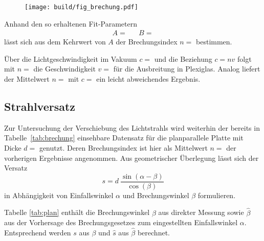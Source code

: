 \begin{figure}[H]
	\texttt{[image: build/fig\_brechung.pdf]}
	\caption{}
	\label{fig:brechung}
\end{figure}

Anhand den so erhaltenen Fit-Parametern
\begin{align*}
	A =  && B = 
\end{align*}
lässt sich aus dem Kehrwert von $A$ der Brechungsindex $n = $ bestimmen. 

\begin{table}[H]
	\centering
	\caption{}
	
	\label{tab:brechung}
\end{table}

Über die Lichtgeschwindigkeit im Vakuum $c = $ \cite{scipy} und die Beziehung $c = nv$ folgt mit $n = $
die Geschwindigkeit $v = $ für die Ausbreitung in Plexiglas. Analog liefert der Mittelwert $n = $
mit $c = $ ein leicht abweichendes Ergebnis.



\subsection{Strahlversatz}

Zur Untersuchung der Verschiebung des Lichtstrahls wird weiterhin der bereits in Tabelle~\ref{tab:brechung} einsehbare Datensatz für die
planparallele Platte mit Dicke $d = $ \cite{reflex} genutzt. Deren Brechungsindex ist hier als Mittelwert
$n = $ der vorherigen Ergebnisse angenommen. Aus geometrischer Überlegung lässt sich der Versatz
\begin{equation*}
	s = d \: \frac{\sin(\alpha - \beta)}{\cos(\beta)}
\end{equation*}
in Abhängigkeit von Einfallswinkel $\alpha$ und Brechungswinkel $\beta$ formulieren.

\begin{table}[H]
	\centering
	\caption{}
	
	\label{tab:plan}
\end{table}

Tabelle \ref{tab:plan} enthält die Brechungswinkel $\beta$ aus direkter Messung sowie $\hat{\beta}$ aus der Vorhersage des Brechungsgesetzes zum
eingestellten Einfallswinkel $\alpha$. Entsprechend werden $s$ aus $\beta$ und $\hat{s}$ aus $\hat{\beta}$ berechnet.


